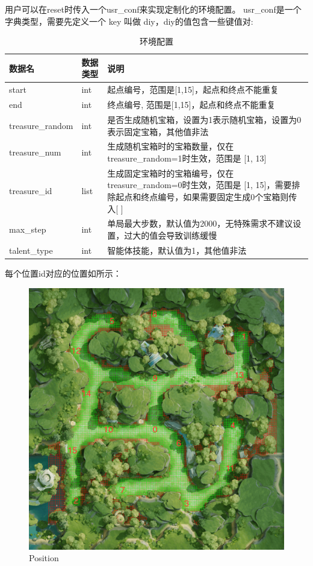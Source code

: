 用户可以在reset时传入一个usr\_conf来实现定制化的环境配置。
usr\_conf是一个字典类型，需要先定义一个 key 叫做 diy，diy的值包含一些键值对:

\begin{table}[H]
    \begin{tabularx}{1\textwidth}{ l l X } %
        \hline %
        \textbf{数据名} & \textbf{数据类型} & \textbf{说明}  \\
        \hline
        start & int & 起点编号，范围是[1,15]，起点和终点不能重复 \\
        end & int & 终点编号, 范围是[1,15]，起点和终点不能重复 \\
        treasure\_random & int & 是否生成随机宝箱，设置为1表示随机宝箱，设置为0表示固定宝箱，其他值非法 \\
        treasure\_num & int & 生成随机宝箱时的宝箱数量，仅在treasure\_random=1时生效，范围是 [1, 13] \\
        treasure\_id & list & 生成固定宝箱时的宝箱编号，仅在treasure\_random=0时生效，范围是 [1, 15]，需要排除起点和终点编号，如果需要固定生成0个宝箱则传入[ ] \\
        max\_step & int & 单局最大步数，默认值为2000，无特殊需求不建议设置，过大的值会导致训练缓慢 \\
        talent\_type & int & 智能体技能，默认值为1，其他值非法 \\
        \hline
    \end{tabularx}

    \centering
    \caption{环境配置}
    \label{user-conf}
\end{table}

每个位置id对应的位置如所示：

\begin{figure}[H]
    \centering
    \includegraphics[width=0.8\linewidth]{pic/position.png}
    \caption{ Position}
    \label{position}
\end{figure}

